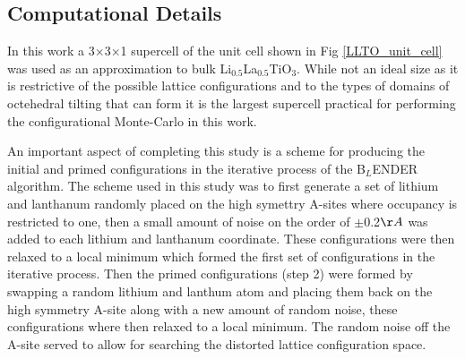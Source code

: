 \documentclass[aps,pre,reprint,superscriptaddress,showkeys]{revtex4-1}
\begin{document}
\subsection{Computational Details}
In this work a 3$\times$3$\times$1 supercell of the unit cell shown in Fig \ref{LLTO_unit_cell} was used as an approximation to bulk Li$_{0.5}$La$_{0.5}$TiO$_{3}$. While not an ideal size as it is  restrictive of the possible lattice configurations and to the types of domains of octehedral tilting that can form it is the largest supercell practical for performing the configurational Monte-Carlo in this work. 

An important aspect of completing this study is a scheme for producing the initial and primed configurations in the iterative process of the B$_L$ENDER algorithm. The scheme used in this study was to first generate a set of lithium and lanthanum randomly placed on the high symettry A-sites where occupancy is restricted to one, then a small amount of noise on the order of $\pm$0.2$\AA$ was added to each lithium and lanthanum coordinate. These configurations were then relaxed to a local minimum which formed the first set of configurations in the iterative process.  Then the primed configurations (step 2) were formed by swapping a random lithium and lanthum atom and placing them back on the high symmetry A-site along with a new amount of random noise, these configurations where then relaxed to a local minimum. The random noise off the A-site served to allow for searching the distorted lattice configuration space. 
\end{document}
